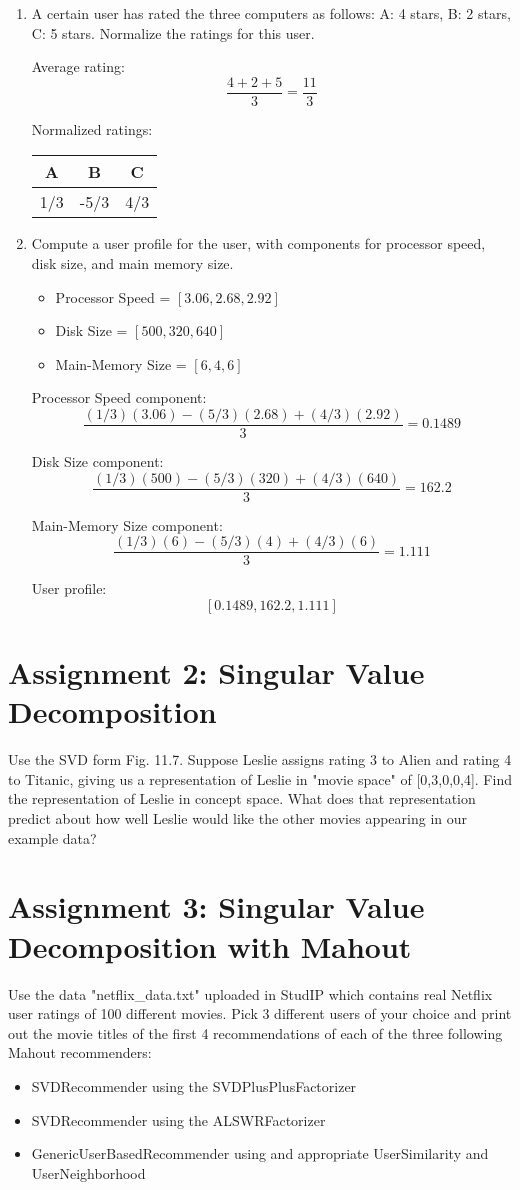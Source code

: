 \documentclass{article}
\begin{document}
\begin{enumerate}
\item{A certain user has rated the three computers as follows: A: 4 stars, B: 2 stars, C: 5 stars. Normalize the ratings for this user.

Average rating: $$\frac{4+2+5}{3} = \frac{11}{3}$$

Normalized ratings:
	\begin{center}
	\begin{tabular}{ c | c | c }
		A    & B     & C    \\ \hline
		1/3 & -5/3 & 4/3
	\end{tabular}
\end{center}
}
\item{Compute a user profile for the user, with components for processor speed, disk size, and main memory size.
	
	\begin{itemize}
		\item Processor Speed = $[3.06, 2.68, 2.92]$
		\item Disk Size = $[500, 320, 640]$
		\item Main-Memory Size = $[6, 4, 6]$
	\end{itemize}

	Processor Speed component:
	$$\frac{(1/3)(3.06)-(5/3)(2.68)+(4/3)(2.92)}{3} = 0.1489$$

	Disk Size component:
	$$\frac{(1/3)(500)-(5/3)(320)+(4/3)(640)}{3} = 162.2$$
	
	Main-Memory Size component:
	$$\frac{(1/3)(6)-(5/3)(4)+(4/3)(6)}{3} = 1.111$$

	User profile:
	$$[0.1489, 162.2, 1.111]$$

}
\end{enumerate}

\section{Assignment 2: Singular Value Decomposition}
Use the SVD form Fig. 11.7. Suppose Leslie assigns rating 3 to Alien and rating 4 to Titanic, giving us a representation of Leslie in "movie space" of [0,3,0,0,4]. Find the representation of Leslie in concept space. What does that representation predict about how well Leslie would like the other movies appearing in our example data?

\section{Assignment 3: Singular Value Decomposition with Mahout}
Use the data "netflix\_data.txt" uploaded in StudIP which contains real Netflix user ratings of 100 different movies. Pick 3 different users of your choice and print out the movie titles of the first 4 recommendations of each of the three following Mahout recommenders:
\begin{itemize}
	\item SVDRecommender using the SVDPlusPlusFactorizer
	\item SVDRecommender using the ALSWRFactorizer
	\item GenericUserBasedRecommender using and appropriate UserSimilarity and UserNeighborhood
\end{itemize}
\end{document}
